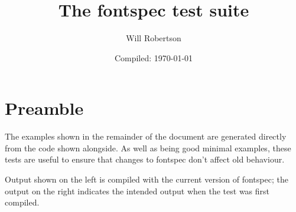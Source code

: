 \documentclass{article}
\begin{document}
\title{The \textsf{fontspec} test suite}
\author{Will Robertson}
\date{Compiled: \today}
\maketitle
\thispagestyle{empty}

\section*{Preamble}

The examples shown in the remainder of the document are generated directly from the code shown alongside.
As well as being good minimal examples, these tests are useful to ensure that changes to \textsf{fontspec} don't affect old behaviour.

Output shown on the left is compiled with the current version of \textsf{fontspec}; the output on the right indicates the intended output when the test was first compiled.


\end{document}
